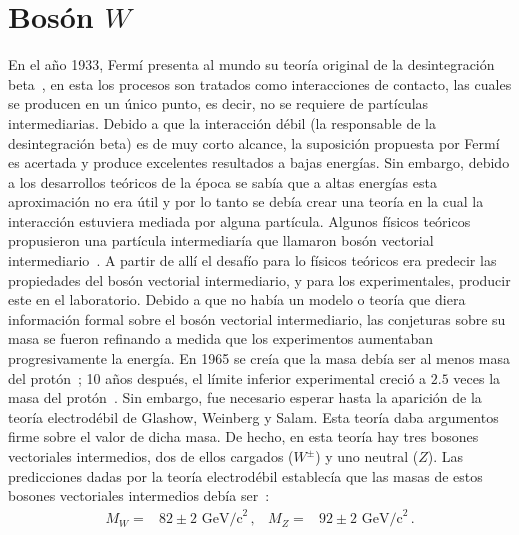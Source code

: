 \chapter{Bosón $W$}\label{Ch:W}
En el año 1933, Fermí presenta al mundo su teoría original de la desintegración beta~\cite{Fermi:1933jpa}, en esta los procesos son tratados como interacciones de contacto, las cuales se producen en un único punto, es decir, no se requiere de partículas intermediarias. Debido a que la interacción débil (la responsable de la desintegración beta) es de muy corto alcance, la suposición propuesta por Fermí es acertada y produce excelentes resultados a bajas energías. Sin embargo, debido a los desarrollos teóricos de la época se sabía que a altas energías esta aproximación no era útil y por lo tanto se debía crear una teoría en la cual la interacción estuviera mediada por alguna partícula. Algunos físicos teóricos propusieron una partícula intermediaría que llamaron bosón  vectorial intermediario~\cite{Lee:1960qw}. A partir de allí el desafío para lo físicos teóricos era predecir las propiedades del bosón vectorial intermediario, y para los experimentales, producir este en el laboratorio.
Debido a que no había un modelo o teoría que diera información formal sobre el bosón vectorial intermediario, las conjeturas sobre su masa se fueron refinando a medida que los experimentos aumentaban progresivamente la energía. En 1965 se creía que la masa debía ser al menos masa del protón~\cite{Kienzle:1965zz}; 10 años después, el límite inferior experimental creció a $2.5$ veces la masa del protón~\cite{Kramer:1970ed}. Sin embargo, fue necesario esperar hasta la aparición de la teoría electrodébil de Glashow, Weinberg y Salam. Esta teoría daba argumentos firme sobre el valor de dicha masa. De hecho, en esta teoría hay tres bosones vectoriales intermedios, dos de ellos cargados ($W^{\pm}$) y uno neutral ($Z$). Las predicciones dadas por la teoría electrodébil establecía que las masas de estos bosones vectoriales intermedios debía ser~\cite{Weinberg:1967tq}:
\begin{align}
M_{W} =& 82 \pm 2 \text{ GeV/c}^2\,, & M_{Z} =& 92 \pm 2 \text{ GeV/c}^2\,.
\end{align}

